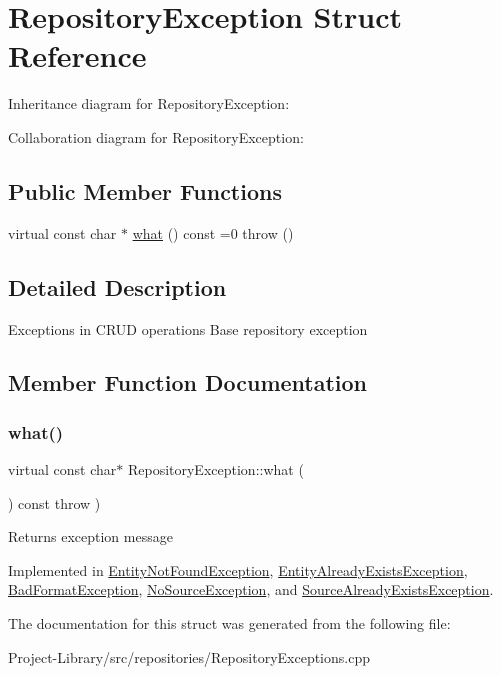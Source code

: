 \hypertarget{structRepositoryException}{}\section{Repository\+Exception Struct Reference}
\label{structRepositoryException}


Inheritance diagram for Repository\+Exception\+:


Collaboration diagram for Repository\+Exception\+:
\subsection*{Public Member Functions}
\begin{DoxyCompactItemize}
\item 
virtual const char $\ast$ \hyperlink{structRepositoryException_a6fdc5fe8fe6abdd205402d8648e5ccd4}{what} () const =0  throw ()
\end{DoxyCompactItemize}


\subsection{Detailed Description}
Exceptions in C\+R\+UD operations Base repository exception 

\subsection{Member Function Documentation}
\mbox{\label{structRepositoryException_a6fdc5fe8fe6abdd205402d8648e5ccd4}} 
\subsubsection{\texorpdfstring{what()}{what()}}
{\footnotesize\ttfamily virtual const char$\ast$ Repository\+Exception\+::what (\begin{DoxyParamCaption}{ }\end{DoxyParamCaption}) const throw  ) \hspace{0.3cm}{\ttfamily [pure virtual]}}

Returns exception message 

Implemented in \hyperlink{structEntityNotFoundException_a888842b13906cd6356228422d4ac9477}{Entity\+Not\+Found\+Exception}, \hyperlink{structEntityAlreadyExistsException_a820d866ae427ee0dccaf839a196e27b5}{Entity\+Already\+Exists\+Exception}, \hyperlink{structBadFormatException_a53a1092ba48db2a0040f50ba4ba3a379}{Bad\+Format\+Exception}, \hyperlink{structNoSourceException_a80ea47f101af8b9596b2af7cfe63da50}{No\+Source\+Exception}, and \hyperlink{structSourceAlreadyExistsException_a2dcdf3a360520302f791da1273effe74}{Source\+Already\+Exists\+Exception}.



The documentation for this struct was generated from the following file\+:\begin{DoxyCompactItemize}
\item 
Project-\/\+Library/src/repositories/Repository\+Exceptions.\+cpp\end{DoxyCompactItemize}
